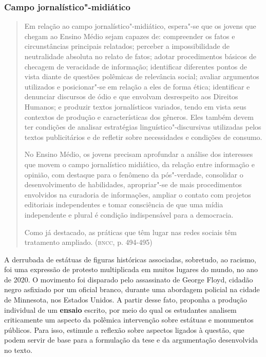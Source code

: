 \documentclass[11pt]{extarticle}
\begin{document}
\begin{enumerate}
\subsubsection{Campo jornalístico"-midiático}

\begin{quote}
Em relação ao campo jornalístico"-midiático, espera"-se que os jovens
que chegam ao Ensino Médio sejam capazes de: compreender os fatos e
circunstâncias principais relatados; perceber a impossibilidade de
neutralidade absoluta no relato de fatos; adotar procedimentos básicos
de checagem de veracidade de informação; identificar diferentes pontos
de vista diante de questões polêmicas de relevância social; avaliar
argumentos utilizados e posicionar"-se em relação a eles de forma ética;
identificar e denunciar discursos de ódio e que envolvam desrespeito aos
Direitos Humanos; e produzir textos jornalísticos variados, tendo em
vista seus contextos de produção e características dos gêneros. Eles
também devem ter condições de analisar estratégias
linguístico"-discursivas utilizadas pelos textos publicitários e de
refletir sobre necessidades e condições de consumo.

No Ensino Médio, os jovens precisam aprofundar a análise dos interesses
que movem o campo jornalístico midiático, da relação entre informação e
opinião, com destaque para o fenômeno da pós"-verdade, consolidar o
desenvolvimento de habilidades, apropriar"-se de mais procedimentos
envolvidos na curadoria de informações, ampliar o contato com projetos
editoriais independentes e tomar consciência de que uma mídia
independente e plural é condição indispensável para a democracia.

Como já destacado, as práticas que têm lugar nas redes sociais têm
tratamento ampliado. (\textsc{bncc}, p. 494-495)
\end{quote}

A derrubada de estátuas de figuras históricas associadas, sobretudo,
ao racismo, foi uma expressão de protesto multiplicada em muitos
lugares do mundo, no ano de 2020. O movimento foi disparado pelo
assassinato de George Floyd, cidadão negro asfixiado por um oficial
branco, durante uma abordagem policial na cidade de Minnesota, nos
Estados Unidos. A partir desse fato, proponha a produção individual de
um \textbf{ensaio} escrito, por meio do qual os estudantes analisem
criticamente um aspecto da polêmica intervenção sobre estátuas e
monumentos públicos. Para isso, estimule a reflexão sobre aspectos
ligados à questão, que podem servir de base para a formulação da tese
e da argumentação desenvolvida no texto.


\end{enumerate}
\end{document}
